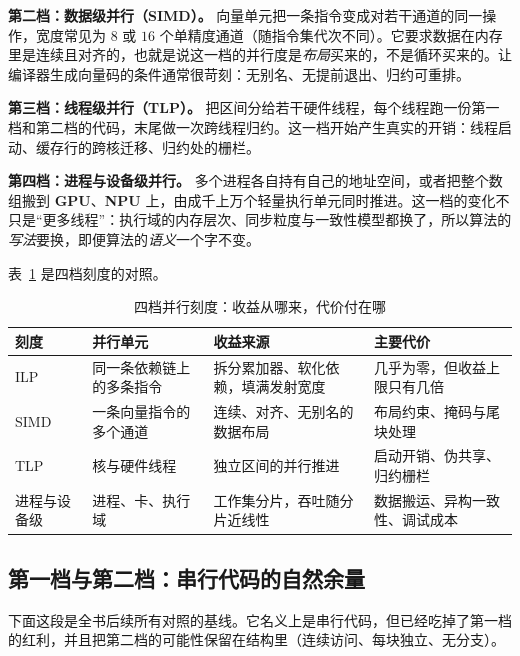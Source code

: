 \documentclass[12pt,a4paper,fontset=fandol]{ctexbook}
\newcommand{\Dom}[1]{\textsf{\bfseries #1}}
\newcommand{\GPU}{\Dom{GPU}}
\newcommand{\NPU}{\Dom{NPU}}
\begin{document}
\textbf{第二档：数据级并行（SIMD）。} 向量单元把一条指令变成对若干通道的同一操作，宽度常见为 $8$ 或 $16$ 个单精度通道（随指令集代次不同）。它要求数据在内存里是连续且对齐的，也就是说这一档的并行度是\emph{布局}买来的，不是循环买来的。让编译器生成向量码的条件通常很苛刻：无别名、无提前退出、归约可重排。

\textbf{第三档：线程级并行（TLP）。} 把区间分给若干硬件线程，每个线程跑一份第一档和第二档的代码，末尾做一次跨线程归约。这一档开始产生真实的开销：线程启动、缓存行的跨核迁移、归约处的栅栏。

\textbf{第四档：进程与设备级并行。} 多个进程各自持有自己的地址空间，或者把整个数组搬到 \GPU、\NPU{} 上，由成千上万个轻量执行单元同时推进。这一档的变化不只是``更多线程''：执行域的内存层次、同步粒度与一致性模型都换了，所以算法的\emph{写法}要换，即便算法的\emph{语义}一个字不变。

表~\ref{tab:ch1-scales} 是四档刻度的对照。

\begin{table}[H]
\centering
\caption{四档并行刻度：收益从哪来，代价付在哪}
\label{tab:ch1-scales}
\small
\begin{tabular}{@{}>{\raggedright\arraybackslash}p{}
  >{\raggedright\arraybackslash}p{}
  >{\raggedright\arraybackslash}p{}
  >{\raggedright\arraybackslash}p{}@{}}
\toprule
刻度 & 并行单元 & 收益来源 & 主要代价 \\
\midrule
ILP & 同一条依赖链上的多条指令 &
  拆分累加器、软化依赖，填满发射宽度 &
  几乎为零，但收益上限只有几倍 \\
SIMD & 一条向量指令的多个通道 &
  连续、对齐、无别名的数据布局 &
  布局约束、掩码与尾块处理 \\
TLP & 核与硬件线程 &
  独立区间的并行推进 &
  启动开销、伪共享、归约栅栏 \\
进程与设备级 & 进程、卡、执行域 &
  工作集分片，吞吐随分片近线性 &
  数据搬运、异构一致性、调试成本 \\
\bottomrule
\end{tabular}
\end{table}

\subsection{第一档与第二档：串行代码的自然余量}

下面这段是全书后续所有对照的基线。它名义上是串行代码，但已经吃掉了第一档的红利，并且把第二档的可能性保留在结构里（连续访问、每块独立、无分支）。
\end{document}
